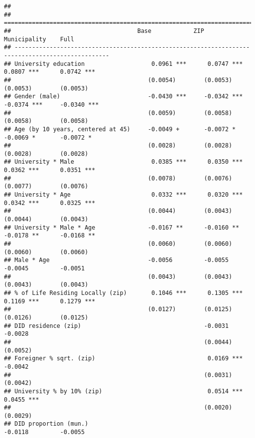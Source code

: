 \documentclass[
]{article}
\begin{document}
\begin{verbatim}
## 
## =================================================================================================
##                                    Base            ZIP             Municipality    Full          
## -------------------------------------------------------------------------------------------------
## University education                   0.0961 ***      0.0747 ***      0.0807 ***      0.0742 ***
##                                       (0.0054)        (0.0053)        (0.0053)        (0.0053)   
## Gender (male)                         -0.0430 ***     -0.0342 ***     -0.0374 ***     -0.0340 ***
##                                       (0.0059)        (0.0058)        (0.0058)        (0.0058)   
## Age (by 10 years, centered at 45)     -0.0049 +       -0.0072 *       -0.0069 *       -0.0072 *  
##                                       (0.0028)        (0.0028)        (0.0028)        (0.0028)   
## University * Male                      0.0385 ***      0.0350 ***      0.0362 ***      0.0351 ***
##                                       (0.0078)        (0.0076)        (0.0077)        (0.0076)   
## University * Age                       0.0332 ***      0.0320 ***      0.0342 ***      0.0325 ***
##                                       (0.0044)        (0.0043)        (0.0044)        (0.0043)   
## University * Male * Age               -0.0167 **      -0.0160 **      -0.0178 **      -0.0168 ** 
##                                       (0.0060)        (0.0060)        (0.0060)        (0.0060)   
## Male * Age                            -0.0056         -0.0055         -0.0045         -0.0051    
##                                       (0.0043)        (0.0043)        (0.0043)        (0.0043)   
## % of Life Residing Locally (zip)       0.1046 ***      0.1305 ***      0.1169 ***      0.1279 ***
##                                       (0.0127)        (0.0125)        (0.0126)        (0.0125)   
## DID residence (zip)                                   -0.0031                         -0.0028    
##                                                       (0.0044)                        (0.0052)   
## Foreigner % sqrt. (zip)                                0.0169 ***                     -0.0042    
##                                                       (0.0031)                        (0.0042)   
## University % by 10% (zip)                              0.0514 ***                      0.0455 ***
##                                                       (0.0020)                        (0.0029)   
## DID proportion (mun.)                                                 -0.0118         -0.0055    

\end{verbatim}
\end{document}
